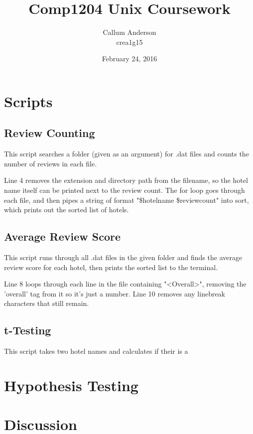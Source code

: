 \documentclass{article}
\title{Comp1204 Unix Coursework}
\author{Callum Anderson \\ crea1g15}
\date{February 24, 2016}
\begin{document}
	
	\maketitle
	\newpage
	
	\tableofcontents
	\newpage
	
	\section{Scripts}
		\subsection{Review Counting}
		
			This script searches a folder (given as an argument) for .dat files and counts the number of reviews in each file.
			
			
			
			Line 4 removes the extension and directory path from the filename, so the hotel name itself can be printed next to the review count. The for loop goes through each file, and then pipes a string of format "\$hotelname \$reviewcount" into sort, which prints out the sorted list of hotels.
			
		\subsection{Average Review Score}
		
			This script runs through all .dat files in the given folder and finds the average review score for each hotel, then prints the sorted list to the terminal.
		
			
			
			Line 8 loops through each line in the file containing "<Overall>", removing the 'overall' tag from it so it's just a number. Line 10 removes any linebreak characters that still remain.
		
		\subsection{t-Testing}
		
			This script takes two hotel names and calculates if their is a 
		
			
		
	\section{Hypothesis Testing}
	
	\section{Discussion}
\end{document}
